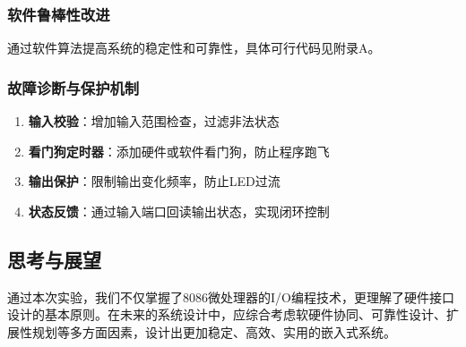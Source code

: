 \documentclass[UTF8]{article}
\begin{document}
\subsubsection{软件鲁棒性改进}

通过软件算法提高系统的稳定性和可靠性，具体可行代码见附录A。

\subsubsection{故障诊断与保护机制}

\begin{enumerate}
    \item \textbf{输入校验}：增加输入范围检查，过滤非法状态
    \item \textbf{看门狗定时器}：添加硬件或软件看门狗，防止程序跑飞
    \item \textbf{输出保护}：限制输出变化频率，防止LED过流
    \item \textbf{状态反馈}：通过输入端口回读输出状态，实现闭环控制
\end{enumerate}

\subsection{思考与展望}

通过本次实验，我们不仅掌握了8086微处理器的I/O编程技术，更理解了硬件接口设计的基本原则。在未来的系统设计中，应综合考虑软硬件协同、可靠性设计、扩展性规划等多方面因素，设计出更加稳定、高效、实用的嵌入式系统。
\end{document}
